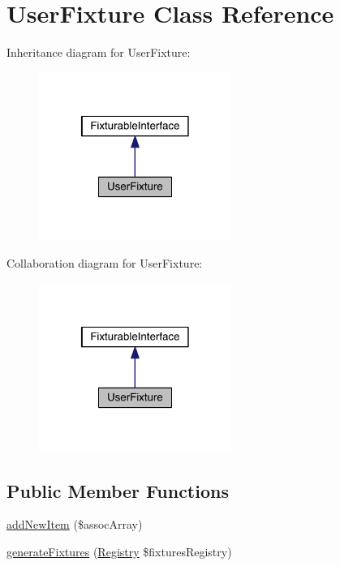 \hypertarget{class_security_1_1_user_fixture}{\section{User\-Fixture Class Reference}
\label{class_security_1_1_user_fixture}
}


Inheritance diagram for User\-Fixture\-:
\nopagebreak
\begin{figure}[H]
\begin{center}
\leavevmode
\includegraphics[width=178pt]{class_security_1_1_user_fixture__inherit__graph}
\end{center}
\end{figure}


Collaboration diagram for User\-Fixture\-:
\nopagebreak
\begin{figure}[H]
\begin{center}
\leavevmode
\includegraphics[width=178pt]{class_security_1_1_user_fixture__coll__graph}
\end{center}
\end{figure}
\subsection*{Public Member Functions}
\begin{DoxyCompactItemize}
\item 
\hyperlink{class_security_1_1_user_fixture_a4ff07981a68955867c222fc0712e323a}{add\-New\-Item} (\$assoc\-Array)
\item 
\hyperlink{class_security_1_1_user_fixture_a60af9abed72c391727622c642cc4c612}{generate\-Fixtures} (\hyperlink{classapp_1_1models_1_1core_1_1_registry}{Registry} \$fixtures\-Registry)
\end{DoxyCompactItemize}
